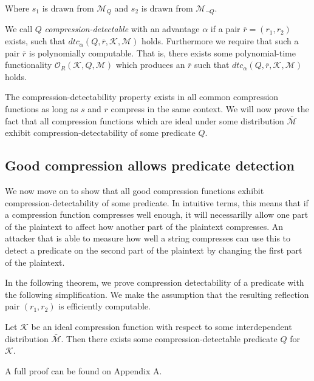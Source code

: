 Where $s_1$ is drawn from $\mathcal{M}_Q$ and $s_2$ is drawn from
$\mathcal{M}_{\lnot Q}$.

We call $Q$ \textit{compression-detectable} with an advantage $\alpha$ if a pair
$\overbar{r} = (r_1, r_2)$ exists, such that $dtc_\alpha(Q, \overbar{r}, \mathcal{K},
\mathcal{M})$ holds. Furthermore we require that such a pair $\overbar{r}$ is
polynomially computable. That is, there exists some polynomial-time
functionality $\mathcal{O}_R(\mathcal{K}, Q, \mathcal{M})$ which produces an
$\overbar{r}$ such that $dtc_\alpha(Q, \overbar{r}, \mathcal{K}, \mathcal{M})$ holds.

The compression-detectability property exists in all common compression
functions as long as $s$ and $r$ compress in the same context. We will now
prove the fact that all compression functions which are ideal under some
distribution $\bar{\mathcal{M}}$ exhibit compression-detectability of some
predicate $Q$.

\subsection{Good compression allows predicate detection}

We now move on to show that all good compression functions exhibit
compression-detectability of some predicate. In intuitive terms, this means
that if a compression function compresses well enough, it will necessarilly
allow one part of the plaintext to affect how another part of the plaintext
compresses. An attacker that is able to measure how well a string compresses
can use this to detect a predicate on the second part of the plaintext by
changing the first part of the plaintext.

In the following theorem, we prove compression detectability of a predicate with
the following simplification. We make the assumption that the resulting
reflection pair $(r_1, r_2)$ is efficiently computable.


\begin{lemma}
Let $\mathcal{K}$ be an ideal compression function with respect to some
interdependent distribution $\bar{\mathcal{M}}$. Then there exists
some compression-detectable predicate $Q$ for $\mathcal{K}$.
\end{lemma}

A full proof can be found on Appendix A.
